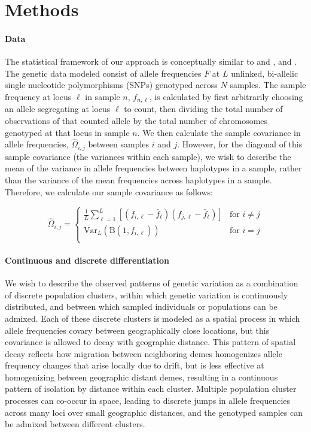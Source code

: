 \documentclass[12pt]{article}
\newcommand{\gb}[1]{{\it\color{magenta}{(#1)}}}
\begin{document}
\section*{Methods}
\paragraph{Data}
The statistical framework of our approach is conceptually similar to \cite{Wasser2004} and \cite{BEDASSLE}, and \cite{spacemix}.
The genetic data modeled consist of allele frequencies $F$ at $L$ unlinked, bi-allelic single nucleotide polymorphisms (SNPs) genotyped across $N$ samples.
The sample frequency at locus $\ell$ in sample $n$, $f_{n,\ell}$, is calculated by first arbitrarily choosing an allele segregating 
at locus $\ell$ to count, 
then dividing the total number of observations of that counted allele by the total number of chromosomes genotyped at that locus
in sample $n$.
We then calculate the sample covariance in allele frequencies, $\widehat{\Omega}_{i,j}$ between samples $i$ and $j$.
However, for the diagonal of this sample covariance (the variances within each sample),
we wish to describe the mean of the variance in allele frequencies between haplotypes in a sample, 
rather than the variance of the mean frequencies across haplotypes in a sample.
Therefore, we calculate our sample covariance as follows:

\begin{equation}
\widehat{\Omega}_{i,j} = 
	\begin{cases}
		\frac{1}{L}
		\sum\limits_{\ell=1}^{L}{\left[ 	\left(f_{i,\ell} - \bar{f}_{\ell} \right)
		 	\left(f_{j,\ell} - \bar{f}_{\ell} \right)\right]
			} & \text{for } i \neq j \\
		\text{Var}_L\left( \text{B}(1,f_{i,\ell})	\right) & \text{for } i = j \\
	\end{cases}
\label{sample_covariance}
\end{equation}
\gb{ideas for how to describe what I'm doing on the diagonal in actual math notation?}

\paragraph{Continuous and discrete differentiation}
We wish to describe the observed patterns of genetic variation as a combination of 
discrete population clusters,
within which genetic variation is continuously distributed, 
and between which sampled individuals or populations can be admixed.
Each of these discrete clusters is modeled as a spatial process in which
allele frequencies covary between geographically close locations,
but this covariance is allowed to decay with geographic distance.
This pattern of spatial decay reflects how migration between neighboring demes  
homogenizes allele frequency changes that arise locally due to drift, 
but is less effective at homogenizing between geographic distant demes,
resulting in a continuous pattern of isolation by distance within each cluster.
Multiple population cluster processes can co-occur in space, 
leading to discrete jumps in allele frequencies across many loci over small geographic distances,
and the genotyped samples can be admixed between different clusters.
\end{document}
